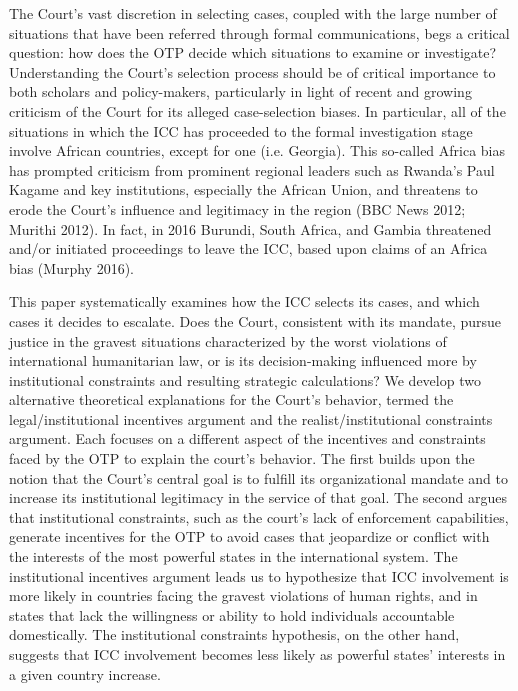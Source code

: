 The Court’s vast discretion in selecting cases, coupled with the large number of situations that have been referred through formal communications, begs a critical question: how does the OTP decide which situations to examine or investigate? Understanding the Court’s selection process should be of critical importance to both scholars and policy-makers, particularly in light of recent and growing criticism of the Court for its alleged case-selection biases. In particular, all of the situations in which the ICC has proceeded to the formal investigation stage involve African countries, except for one (i.e. Georgia). This so-called Africa bias has prompted criticism from prominent regional leaders such as Rwanda’s Paul Kagame and key institutions, especially the African Union, and threatens to erode the Court’s influence and legitimacy in the region (BBC News 2012; Murithi 2012).  In fact, in 2016 Burundi, South Africa, and Gambia threatened and/or initiated proceedings to leave the ICC, based upon claims of an Africa bias (Murphy 2016).

This paper systematically examines how the ICC selects its cases, and which cases it decides to escalate. Does the Court, consistent with its mandate, pursue justice in the gravest situations characterized by the worst violations of international humanitarian law, or is its decision-making influenced more by institutional constraints and resulting strategic calculations?  We develop two alternative theoretical explanations for the Court’s behavior, termed the legal/institutional incentives argument and the realist/institutional constraints argument. Each focuses on a different aspect of the incentives and constraints faced by the OTP to explain the court’s behavior.  The first builds upon the notion that the Court’s central goal is to fulfill its organizational mandate and to increase its institutional legitimacy in the service of that goal. The second argues that institutional constraints, such as the court’s lack of enforcement capabilities, generate incentives for the OTP to avoid cases that jeopardize or conflict with the interests of the most powerful states in the international system.  The institutional incentives argument leads us to hypothesize that ICC involvement is more likely in countries facing the gravest violations of human rights, and in states that lack the willingness or ability to hold individuals accountable domestically. The institutional constraints hypothesis, on the other hand, suggests that ICC involvement becomes less likely as powerful states’ interests in a given country increase.  

